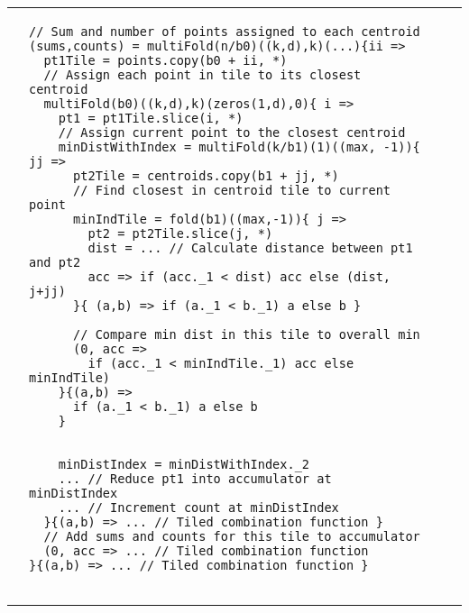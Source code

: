 \documentclass[pageno]{jpaper}
\begin{document}
\begin{figure*}\small\centering
\hspace{-0.105\textwidth}
\centering\begin{tabular}{cm{}m{}m{}}
{} &
{\begin{lstlisting}
// Sum and number of points assigned to each centroid
(sums,counts) = multiFold(n/b0)((k,d),k)(...){ii =>
  pt1Tile = points.copy(b0 + ii, *)
  // Assign each point in tile to its closest centroid
  multiFold(b0)((k,d),k)(zeros(1,d),0){ i =>
    pt1 = pt1Tile.slice(i, *)
    // Assign current point to the closest centroid
    minDistWithIndex = multiFold(k/b1)(1)((max, -1)){ jj =>
      pt2Tile = centroids.copy(b1 + jj, *)
      // Find closest in centroid tile to current point
      minIndTile = fold(b1)((max,-1)){ j =>
        pt2 = pt2Tile.slice(j, *)
        dist = ... // Calculate distance between pt1 and pt2
        acc => if (acc._1 < dist) acc else (dist, j+jj)
      }{ (a,b) => if (a._1 < b._1) a else b }

      // Compare min dist in this tile to overall min
      (0, acc =>
        if (acc._1 < minIndTile._1) acc else minIndTile)
    }{(a,b) =>
      if (a._1 < b._1) a else b
    }


    minDistIndex = minDistWithIndex._2
    ... // Reduce pt1 into accumulator at minDistIndex
    ... // Increment count at minDistIndex
  }{(a,b) => ... // Tiled combination function }
  // Add sums and counts for this tile to accumulator
  (0, acc => ... // Tiled combination function
}{(a,b) => ... // Tiled combination function }


\end{lstlisting}}
\end{tabular}
\end{figure*}
\end{document}
